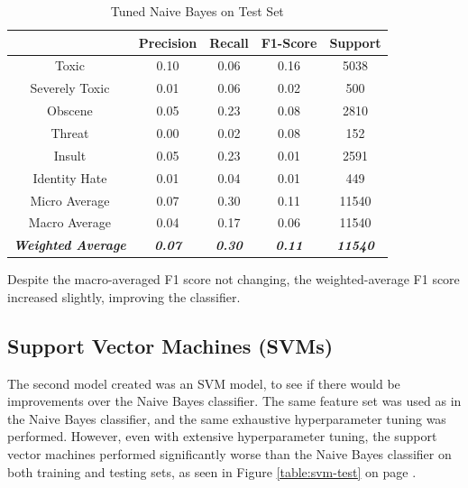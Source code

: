 \documentclass{article}
\begin{document}
{{	  \begin{table}[h!]
		  \centering
		  \begin{tabular}{|c|| c c c c|}
			  \hline
			                                     & Precision              & Recall                 & F1-Score               & Support                 \\ [0.5ex]
			  \hline\hline
			  Toxic                              & 0.10                   & 0.06                   & 0.16                   & 5038                    \\
			  Severely Toxic                     & 0.01                   & 0.06                   & 0.02                   & 500                     \\
			  Obscene                            & 0.05                   & 0.23                   & 0.08                   & 2810                    \\
			  Threat                             & 0.00                   & 0.02                   & 0.08                   & 152                     \\
			  Insult                             & 0.05                   & 0.23                   & 0.01                   & 2591                    \\
			  Identity Hate                      & 0.01                   & 0.04                   & 0.01                   & 449                     \\
			  \hline\hline
			  Micro Average                      & 0.07                   & 0.30                   & 0.11                   & 11540                   \\
			  Macro Average                      & 0.04                   & 0.17                   & 0.06                   & 11540                   \\
			  \textit{\textbf{Weighted Average}} & \textit{\textbf{0.07}} & \textit{\textbf{0.30}} & \textit{\textbf{0.11}} & \textit{\textbf{11540}} \\

			  \hline
		  \end{tabular}
		  \caption{Tuned Naive Bayes on Test Set}
		  \label{table:nb-test}
	  \end{table}

	  Despite the macro-averaged F1 score not changing, the weighted-average F1
	  score increased slightly, improving the classifier.
  }
  \subsection{Support Vector Machines (SVMs)}{
	  The second model created was an SVM model, to see if there would be
	  improvements over the Naive Bayes classifier. The same feature set was used
	  as in the Naive Bayes classifier, and the same exhaustive hyperparameter
	  tuning was performed. However, even with extensive hyperparameter tuning,
	  the support vector machines performed significantly worse than the Naive
	  Bayes classifier on both training and testing sets, as seen in Figure
	  \ref{table:svm-test} on page \pageref{table:svm-test}.

}}
\end{document}
